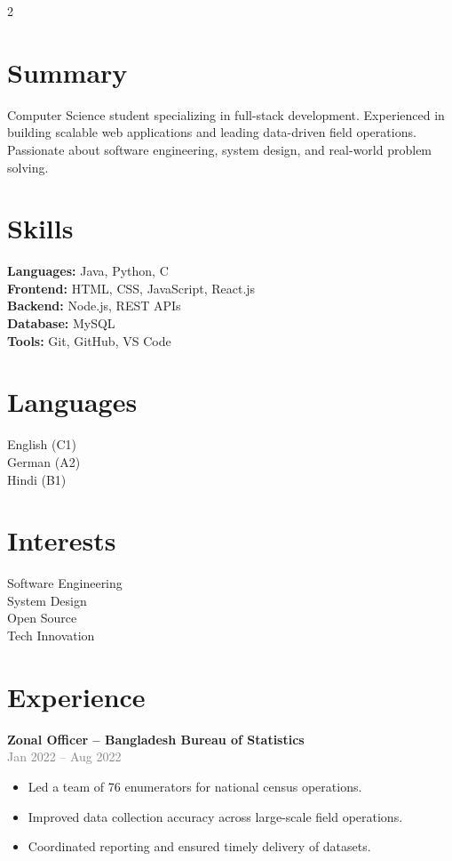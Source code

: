 \documentclass[11pt,a4paper]{article}
\begin{document}
\begin{multicols}{2}


\section*{Summary}
Computer Science student specializing in full-stack development. Experienced in building scalable web applications and leading data-driven field operations. Passionate about software engineering, system design, and real-world problem solving.

\section*{Skills}
\textbf{Languages:} Java, Python, C \\
\textbf{Frontend:} HTML, CSS, JavaScript, React.js \\
\textbf{Backend:} Node.js, REST APIs \\
\textbf{Database:} MySQL \\
\textbf{Tools:} Git, GitHub, VS Code

\section*{Languages}
English (C1) \\
German (A2) \\
Hindi (B1)

\section*{Interests}
Software Engineering \\
System Design \\
Open Source \\
Tech Innovation


\columnbreak

\section*{Experience}

\textbf{Zonal Officer -- Bangladesh Bureau of Statistics} \\
\textcolor{gray}{Jan 2022 -- Aug 2022}

\begin{itemize}
    \item Led a team of 76 enumerators for national census operations.
    \item Improved data collection accuracy across large-scale field operations.
    \item Coordinated reporting and ensured timely delivery of datasets.
\end{itemize}


\end{multicols}
\end{document}
